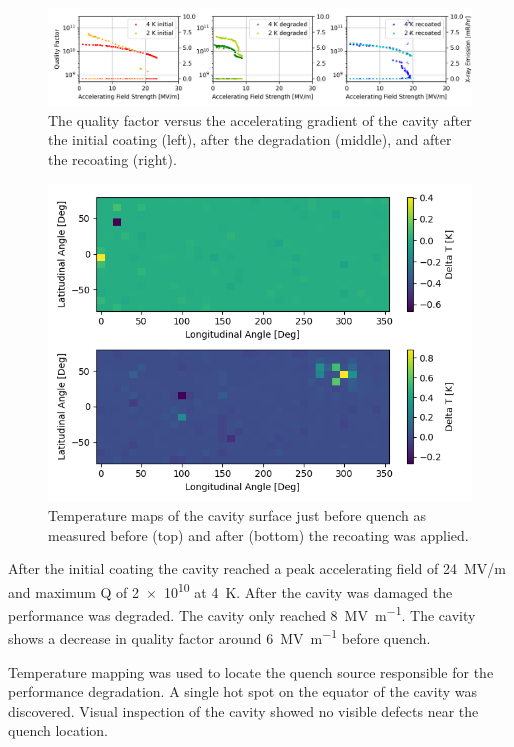 \documentclass{revtex4-2}
\begin{document}
\begin{figure}[h]%
    \centering%
    \includegraphics[width=1.0\columnwidth]{./figures/VTS.png}%
    \caption{The quality factor versus the accelerating gradient of the cavity after the initial coating (left), after the degradation (middle), and after the recoating (right).}%
    \label{fig:VTS}%
\end{figure}

\begin{figure}[h]%
    \centering%
    \includegraphics{./figures/TMAP.png}%
    \caption{Temperature maps of the cavity surface just before quench as measured before (top) and after (bottom) the recoating was applied.}%
    \label{fig:VTS}%
\end{figure}

After the initial coating the cavity reached a peak accelerating field of 24~MV/m and maximum Q of \num{2e10} at \qty{4}{\kelvin}. After the cavity was damaged the performance was degraded. The cavity only reached \qty{8}{\mega\volt\per\meter}. The cavity shows a decrease in quality factor around \qty{6}{\mega\volt\per\meter} before quench.

Temperature mapping was used to locate the quench source responsible for the performance degradation. A single hot spot on the equator of the cavity was discovered. Visual inspection of the cavity showed no visible defects near the quench location.
\end{document}
